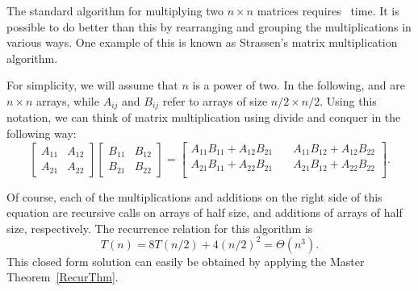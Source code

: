 The standard algorithm for multiplying two $n \times n$ matrices
requires \Thetanthree\ time.
It is possible to do better than this by rearranging and grouping the
multiplications in various ways.
One example of this is known as Strassen's matrix multiplication
algorithm.

For simplicity, we will assume that $n$ is a power of two.
In the following,  and  are $n \times n$ arrays,
while $A_{ij}$ and $B_{ij}$ refer to arrays of size $n/2 \times n/2$.
Using this notation, we can think of matrix multiplication using
divide and conquer in the following way:
\[\left [ \begin{array}{cc}
A_{11} & A_{12}\\
A_{21} & A_{22}
\end{array}
\right ]\!\!\left [ \begin{array}{cc}
B_{11} & B_{12}\\
B_{21} & B_{22}
\end{array}
\right ] = \left [ \begin{array}{cc}
A_{11}B_{11} + A_{12}B_{21}\!\! & \quad
A_{11}B_{12} + A_{12}B_{22}\\
A_{21}B_{11} + A_{22}B_{21}\!\! & \quad
A_{21}B_{12} + A_{22}B_{22}\\
\end{array}
\right ].\]

Of course, each of the multiplications and additions on the right side
of this equation are recursive calls on arrays of half size, and
additions of arrays of half size, respectively.
The recurrence relation for this algorithm is
\[T(n) = 8T(n/2) + 4(n/2)^2 = \Theta(n^3).\]
This closed form solution can easily be obtained by applying the
Master Theorem~\ref{RecurThm}.

